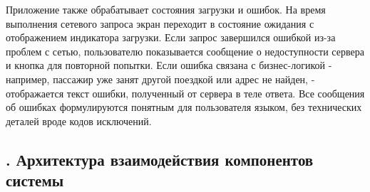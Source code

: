 {\par \redline Приложение также обрабатывает состояния загрузки и ошибок. На время выполнения сетевого запроса экран переходит в состояние ожидания с отображением индикатора загрузки. Если запрос завершился ошибкой из-за проблем с сетью, пользователю показывается сообщение о недоступности сервера и кнопка для повторной попытки. Если ошибка связана с бизнес-логикой - например, пассажир уже занят другой поездкой или адрес не найден, - отображается текст ошибки, полученный от сервера в теле ответа. Все сообщения об ошибках формулируются понятным для пользователя языком, без технических деталей вроде кодов исключений.
	
	\par
}

\titlespace

\subsection*{ 
	\gostTitleFont
	\redline
	\thechaptercntr .\thesubchaptercntr \spc
	Архитектура взаимодействия компонентов системы
} \addtocounter{subchaptercntr}{1}

\subtitlespace


